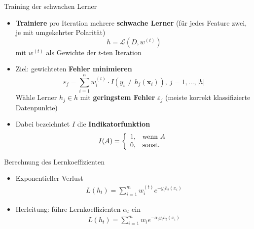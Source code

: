\documentclass[hyperref={bookmarks=false},11pt,dvipsnames]{beamer}
\begin{document}
\begin{frame}[t]{Training der schwachen Lerner}
	\begin{itemize}
		\item <1-> \textbf{Trainiere} pro Iteration mehrere \textbf{schwache Lerner} (für jedes Feature zwei, je mit umgekehrter Polarität)
		      $$
			      h = \mathcal{L}(D, w^{(t)})
		      $$
		      mit $w^{(t)}$ als Gewichte der $t$-ten Iteration
		\item <2-> Ziel: gewichteten \textbf{Fehler minimieren}
		      $$
			      \varepsilon_j = \sum_{i=1}^n w_i^{(t)}\cdot I\left(y_i \neq h_j\left(\boldsymbol{x}_i\right)\right),~j=1,\dots,|h|
		      $$
		      Wähle Lerner $h_j\in h$ mit \textbf{geringstem Fehler} $\varepsilon_j$ (meiste korrekt klassifizierte Datenpunkte)
		\item <3-> Dabei bezeichntet $I$ die \textbf{Indikatorfunktion}
		      $$
			      I(A)=\left\{\begin{array}{l l}
				      1, & \text{wenn } A \\
				      0, & \text{sonst.}
			      \end{array}\right.
		      $$
	\end{itemize}
\end{frame}

\begin{frame}[t]{Berechnung des Lernkoeffizienten}
	\begin{itemize}
		\item <1-> Exponentieller Verlust \begin{align*}
			      L(h_t) = \sum_{i=1}^{m} w_i^{(t)}e^{-y_ih_t(x_i)}
		      \end{align*}
		\item <2-> Herleitung: führe Lernkoeffizienten $\alpha_t$ ein \begin{align*}
			      L(h_t)=\sum_{i=1}^{m}w_ie^{-\alpha_ty_ih_t(x_i)}
		      \end{align*}
	\end{itemize}
\end{frame}
\end{document}
